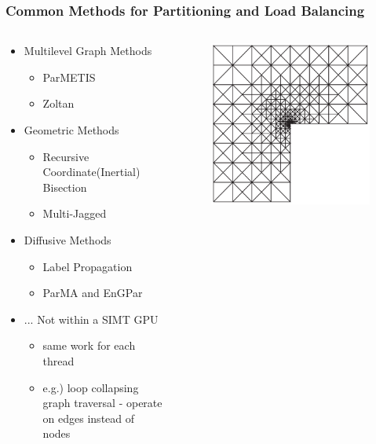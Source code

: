 \documentclass[aspectratio=169]{beamer}
\begin{document}
\begin{frame}
  \frametitle{Common Methods for Partitioning and Load Balancing}
  \begin{columns}
    \begin{column}{0.4\textwidth}
      \begin{itemize}
        \item Multilevel Graph Methods %
          \begin{itemize}
            \item ParMETIS
            \item Zoltan
          \end{itemize}
        \item Geometric Methods %
          \begin{itemize}
            \item Recursive Coordinate(Inertial) Bisection
            \item Multi-Jagged
          \end{itemize}
        \item Diffusive Methods %
          \begin{itemize}
            \item Label Propagation
            \item ParMA and EnGPar
          \end{itemize}
        \item ... Not within a SIMT GPU
          \begin{itemize}
            \item same work for each thread
            \item e.g.) loop collapsing graph traversal - operate on edges
              instead of nodes
          \end{itemize}
      \end{itemize}
    \end{column}
    \begin{column}{0.6\textwidth}
      \begin{figure}
        \centering
        \includegraphics[width=.32\textwidth]{figures/mitchellMesh.png}

\end{figure}
\end{column}
\end{columns}
\end{frame}
\end{document}
